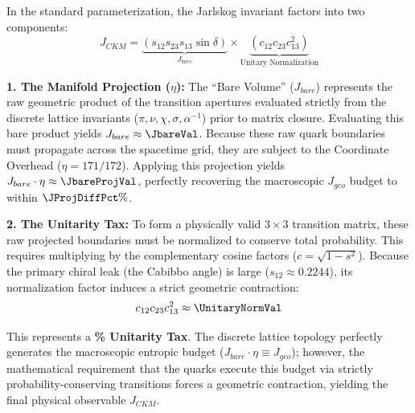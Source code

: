 In the standard parameterization, the Jarlskog invariant factors into two components:
\begin{equation}
    J_{CKM} = \underbrace{(s_{12} s_{23} s_{13} \sin\delta)}_{J_{bare}} \times \underbrace{(c_{12} c_{23} c_{13}^2)}_{\text{Unitary Normalization}}
\end{equation}

\textbf{1. The Manifold Projection ($\eta$):} The ``Bare Volume'' ($J_{bare}$) represents the raw geometric product of the transition apertures evaluated strictly from the discrete lattice invariants ($\pi, \nu, \chi, \sigma, \alpha^{-1}$) prior to matrix closure. Evaluating this bare product yields $J_{bare} \approx \mathbf{\JbareVal}$. Because these raw quark boundaries must propagate across the spacetime grid, they are subject to the Coordinate Overhead ($\eta = 171/172$). Applying this projection yields $J_{bare} \cdot \eta \approx \mathbf{\JbareProjVal}$, perfectly recovering the macroscopic $J_{geo}$ budget to within $\mathbf{\JProjDiffPct\%}$. 

\textbf{2. The Unitarity Tax:} To form a physically valid $3 \times 3$ transition matrix, these raw projected boundaries must be normalized to conserve total probability. This requires multiplying by the complementary cosine factors ($c = \sqrt{1-s^2}$). Because the primary chiral leak (the Cabibbo angle) is large ($s_{12} \approx 0.2244$), its normalization factor induces a strict geometric contraction:
\begin{equation}
    c_{12}c_{23}c_{13}^2 \approx \mathbf{\UnitaryNormVal}
\end{equation}

This represents a \textbf{\UnitarityTaxPct\% Unitarity Tax}. The discrete lattice topology perfectly generates the macroscopic entropic budget ($J_{bare} \cdot \eta \equiv J_{geo}$); however, the mathematical requirement that the quarks execute this budget via strictly probability-conserving transitions forces a geometric contraction, yielding the final physical observable $J_{CKM}$.